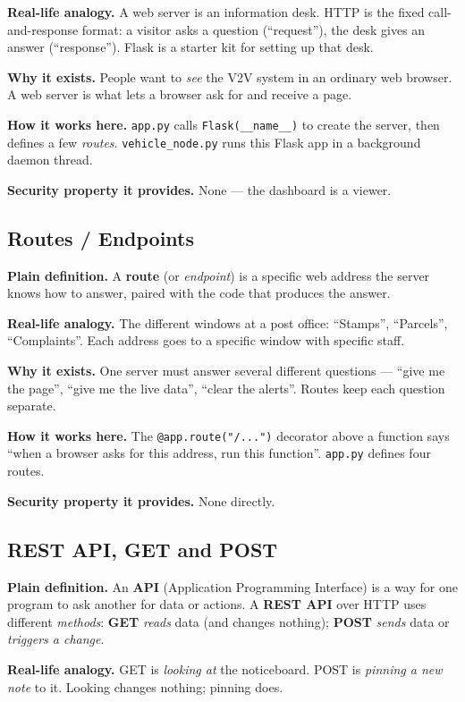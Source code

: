 \documentclass[11pt,a4paper]{article}
\begin{document}
\textbf{Real-life analogy.} A web server is an information desk. HTTP is the
fixed call-and-response format: a visitor asks a question (``request''), the desk
gives an answer (``response''). Flask is a starter kit for setting up that desk.

\textbf{Why it exists.} People want to \emph{see} the V2V system in an ordinary
web browser. A web server is what lets a browser ask for and receive a page.

\textbf{How it works here.} \texttt{app.py} calls \texttt{Flask(\_\_name\_\_)} to
create the server, then defines a few \emph{routes}. \texttt{vehicle\_node.py}
runs this Flask app in a background daemon thread.

\textbf{Security property it provides.} None --- the dashboard is a viewer.

\subsection{Routes / Endpoints}
\textbf{Plain definition.} A \textbf{route} (or \emph{endpoint}) is a specific
web address the server knows how to answer, paired with the code that produces
the answer.

\textbf{Real-life analogy.} The different windows at a post office: ``Stamps'',
``Parcels'', ``Complaints''. Each address goes to a specific window with specific
staff.

\textbf{Why it exists.} One server must answer several different questions ---
``give me the page'', ``give me the live data'', ``clear the alerts''. Routes
keep each question separate.

\textbf{How it works here.} The \texttt{@app.route("/...")} decorator above a
function says ``when a browser asks for this address, run this function''.
\texttt{app.py} defines four routes.

\textbf{Security property it provides.} None directly.

\subsection{REST API, GET and POST}
\textbf{Plain definition.} An \textbf{API} (Application Programming Interface) is
a way for one program to ask another for data or actions. A \textbf{REST API}
over HTTP uses different \emph{methods}: \textbf{GET} \emph{reads} data (and
changes nothing); \textbf{POST} \emph{sends} data or \emph{triggers a change}.

\textbf{Real-life analogy.} GET is \emph{looking at} the noticeboard. POST is
\emph{pinning a new note} to it. Looking changes nothing; pinning does.
\end{document}
